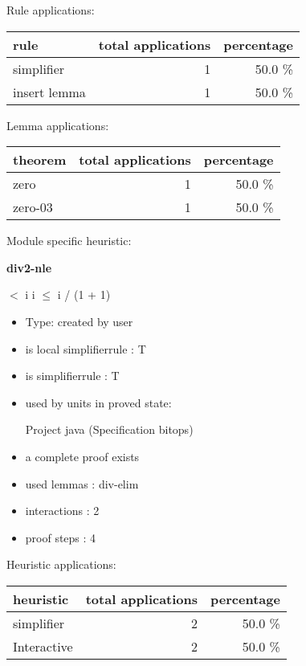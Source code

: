 \documentclass[a4paper]{article}
\begin{document}
Rule applications:

\begin{supertabular}{l|r|r}
rule	        & total applications & percentage \\ \hline
simplifier & 1 & 50.0 \% \\
insert lemma & 1 & 50.0 \% \\

\end{supertabular}

Lemma applications:

\begin{supertabular}{l|r|r}
theorem	        & total applications & percentage \\ \hline
zero & 1 & 50.0 \% \\
zero-03 & 1 & 50.0 \% \\

\end{supertabular}

Module specific heuristic:

\pagebreak

{\LARGE\bf div2-nle}\label{lemma-div2-nle}

\medskip

  $<$ i \Imp \Not i $\le$ i / (1 + 1)

\begin{itemize}

\item Type: created by user

\item is local simplifierrule : T
\item is simplifierrule : T
\item used by units in proved state:

Project java (Specification bitops)
\item       a complete proof exists
\item       used lemmas  : div-elim
\item       interactions : 2
\item       proof steps  : 4
\end{itemize}

\medskip


Heuristic applications:

\begin{supertabular}{l|r|r}
heuristic	& total applications & percentage \\ \hline
simplifier & 2 & 50.0 \% \\
Interactive & 2 & 50.0 \% \\

\end{supertabular}
\end{document}
